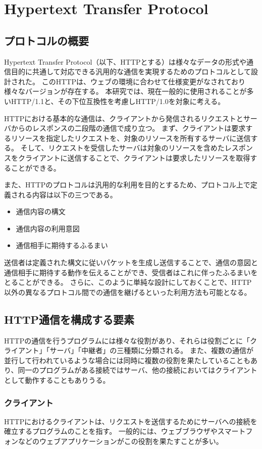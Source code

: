 \section{Hypertext Transfer Protocol}
\subsection{プロトコルの概要}
Hypertext Transfer Protocol（以下、HTTPとする）は様々なデータの形式や通信目的に共通して対応できる汎用的な通信を実現するためのプロトコルとして設計された。
このHTTPは、ウェブの環境に合わせて仕様変更がなされており様々なバージョンが存在する。
本研究では、現在一般的に使用されることが多いHTTP/1.1\cite{rfc7230,rfc7231,rfc7232,rfc7233,rfc7234,rfc7235}と、その下位互換性を考慮しHTTP/1.0\cite{rfc1945}を対象に考える。

HTTPにおける基本的な通信は、クライアントから発信されるリクエストとサーバからのレスポンスの二段階の通信で成り立つ。
まず、クライアントは要求するリソースを指定したリクエストを、対象のリソースを所有するサーバに送信する。
そして、リクエストを受信したサーバは対象のリソースを含めたレスポンスをクライアントに送信することで、クライアントは要求したリソースを取得することができる。

また、HTTPのプロトコルは汎用的な利用を目的とするため、プロトコル上で定義される内容は以下の三つである。
\begin{itemize}
\item 通信内容の構文
\item 通信内容の利用意図
\item 通信相手に期待するふるまい
\end{itemize}
送信者は定義された構文に従いパケットを生成し送信することで、通信の意図と通信相手に期待する動作を伝えることができ、受信者はこれに伴ったふるまいをとることができる。
さらに、このように単純な設計にしておくことで、HTTP以外の異なるプロトコル間での通信を継げるといった利用方法も可能となる。

\subsection{HTTP通信を構成する要素}
HTTPの通信を行うプログラムには様々な役割があり、それらは役割ごとに「クライアント」「サーバ」「中継者」の三種類に分類される。
また、複数の通信が並行して行われているような場合には同時に複数の役割を果たしていることもあり、同一のプログラムがある接続ではサーバ、他の接続においてはクライアントとして動作することもありうる。

\subsubsection{クライアント}
HTTPにおけるクライアントは、リクエストを送信するためにサーバへの接続を確立するプログラムのことを指す。
一般的には、ウェブブラウザやスマートフォンなどのウェブアプリケーションがこの役割を果たすことが多い。

